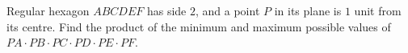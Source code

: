Regular hexagon $ABCDEF$ has side $2$, and a point $P$ in its plane is $1$ unit from its centre. Find the product of the minimum and maximum possible values of $PA\cdot PB\cdot PC\cdot PD\cdot PE\cdot PF$.
